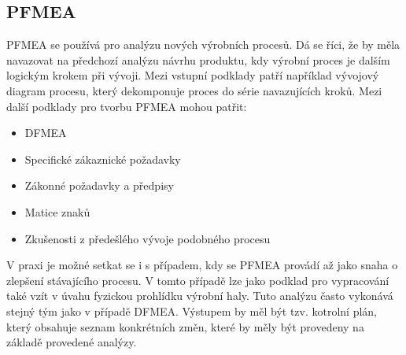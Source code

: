 \subsection{PFMEA}
\label{subsec:PFMEA}
PFMEA se používá pro analýzu nových výrobních procesů. \cite{pfmea} Dá se říci, že by měla navazovat na předchozí analýzu návrhu produktu, kdy výrobní proces je dalším logickým krokem při vývoji. Mezi vstupní podklady patří například vývojový diagram procesu, který dekomponuje proces do série navazujících kroků. Mezi další podklady pro tvorbu PFMEA mohou patřit: 
\begin{itemize}
	\item  DFMEA
	\item  Specifické zákaznické požadavky
	\item  Zákonné požadavky a předpisy
	\item  Matice znaků
	\item  Zkušenosti z předešlého vývoje podobného procesu
\end{itemize}
V praxi je možné setkat se i s případem, kdy se PFMEA provádí až jako snaha o zlepšení stávajícího procesu. V tomto případě lze jako podklad pro vypracování také vzít v úvahu fyzickou prohlídku výrobní haly. Tuto analýzu často vykonává stejný tým jako v případě DFMEA. Výstupem by měl být tzv. kotrolní plán, který obsahuje seznam konkrétních změn, které by měly být provedeny na základě provedené analýzy. 
\endinput